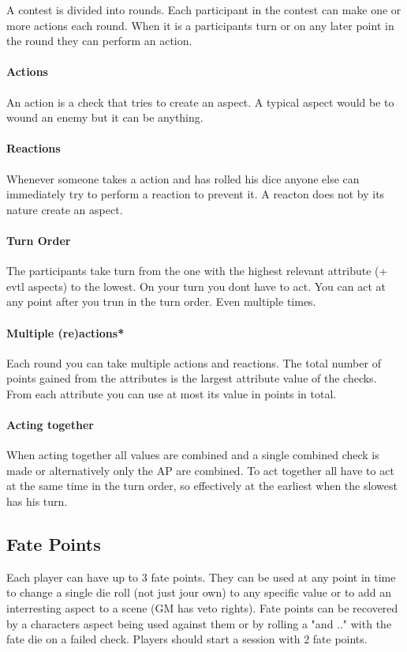 \documentclass[11pt]{article}
\begin{document}
{A contest is divided into rounds. Each participant in the contest can make one or more actions each round. When it is a participants turn or on any later point in the round they can perform an action.

\paragraph*{Actions}
\label{sec:org7dd7a18}
An action is a check that tries to create an aspect. A typical aspect would be to wound an enemy but it can be anything.

\paragraph*{Reactions}
\label{sec:org9be2579}
Whenever someone takes a action and has rolled his dice anyone else can immediately try to perform a reaction to prevent it. A reacton does not by its nature create an aspect. 

\paragraph*{Turn Order}
\label{sec:org1652a3c}
The participants take turn from the one with the highest relevant attribute (+ evtl aspects) to the lowest. On your turn you dont have to act. You can act at any point after you trun in the turn order. Even multiple times. 

\paragraph*{Multiple (re)actions*}
\label{sec:orgacd3246}
Each round you can take multiple actions and reactions. The total number of points gained from the attributes is the largest attribute value of the checks. From each attribute you can use at most its value in points in total.

\paragraph*{Acting together}
\label{sec:orgacf4577}
When acting together all values are combined and a single combined check is made or alternatively only the AP are combined. To act together all have to act at the same time in the turn order, so effectively at the earliest when the slowest has his turn.

\subsection{Fate Points}
\label{sec:org26d5756}
Each player can have up to 3 fate points. They can be used at any point in time to change a single die roll (not just jour own) to any specific value or to add an interresting aspect to a scene (GM has veto rights). Fate points can be recovered by a characters aspect being used against them or by rolling a "and .." with the fate die on a failed check. Players should start a session with 2 fate points.


}
\end{document}
